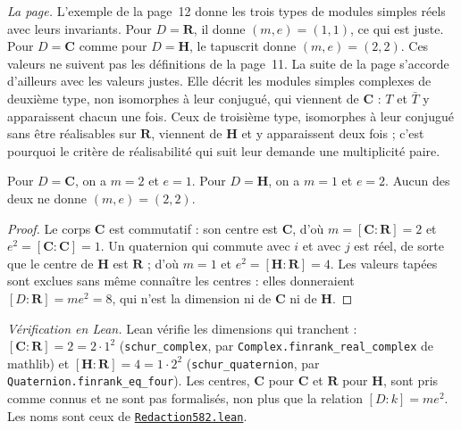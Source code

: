 \emph{La page.} L'exemple de la page~12 donne les trois types de modules simples réels avec leurs invariants. Pour $D = \mathbf R$, il donne $(m, e) = (1, 1)$, ce qui est juste. Pour $D = \mathbf C$ comme pour $D = \mathbf H$, le tapuscrit donne $(m, e) = (2, 2)$. Ces valeurs ne suivent pas les définitions de la page~11. La suite de la page s'accorde d'ailleurs avec les valeurs justes. Elle décrit les modules simples complexes de deuxième type, non isomorphes à leur conjugué, qui viennent de $\mathbf C$ : $T$ et $\bar T$ y apparaissent chacun une fois. Ceux de troisième type, isomorphes à leur conjugué sans être réalisables sur $\mathbf R$, viennent de $\mathbf H$ et y apparaissent deux fois ; c'est pourquoi le critère de réalisabilité qui suit leur demande une multiplicité paire.

\begin{encadre}
\begin{enonce}
Pour $D = \mathbf C$, on a $m = 2$ et $e = 1$. Pour $D = \mathbf H$, on a $m = 1$ et $e = 2$. Aucun des deux ne donne $(m, e) = (2, 2)$.
\end{enonce}
\end{encadre}

\begin{proof}
Le corps $\mathbf C$ est commutatif : son centre est $\mathbf C$, d'où $m = [\mathbf C : \mathbf R] = 2$ et $e^2 = [\mathbf C : \mathbf C] = 1$. Un quaternion qui commute avec $i$ et avec $j$ est réel, de sorte que le centre de $\mathbf H$ est $\mathbf R$ ; d'où $m = 1$ et $e^2 = [\mathbf H : \mathbf R] = 4$. Les valeurs tapées sont exclues sans même connaître les centres : elles donneraient $[D : \mathbf R] = m e^2 = 8$, qui n'est la dimension ni de $\mathbf C$ ni de $\mathbf H$.
\end{proof}

\noindent\emph{Vérification en Lean.} Lean vérifie les dimensions qui tranchent : $[\mathbf C : \mathbf R] = 2 = 2 \cdot 1^2$ (\texttt{schur\_complex}, par \texttt{Complex.\allowbreak{}finrank\_real\_complex} de mathlib) et $[\mathbf H : \mathbf R] = 4 = 1 \cdot 2^2$ (\texttt{schur\_quaternion}, par \texttt{Quaternion.\allowbreak{}finrank\_eq\_four}). Les centres, $\mathbf C$ pour $\mathbf C$ et $\mathbf R$ pour $\mathbf H$, sont pris comme connus et ne sont pas formalisés, non plus que la relation $[D : k] = m e^2$. Les noms sont ceux de \href{\leanblobmain/Redaction582.lean}{\texttt{Redaction582.\allowbreak{}lean}}.

